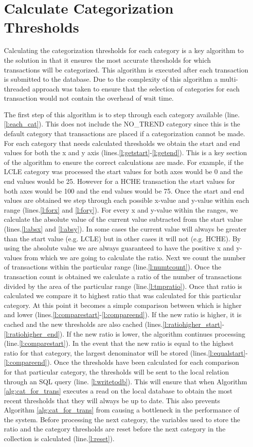 \section{Calculate Categorization Thresholds}
\label{pbs:calc_cat_thresholds}
Calculating the categorization thresholds for each category is a key algorithm to the solution in that it ensures the most accurate thresholds for which transactions will be categorized. This algorithm is executed after each transaction is submitted to the database. Due to the complexity of this algorithm a multi-threaded approach was taken to ensure that the selection of categories for each transaction would not contain the overhead of wait time.

The first step of this algorithm is to step through each category available (line.\ref{l:each_cat}). This does not include the NO\_TREND category since this is the default category that transactions are placed if a categorization cannot be made. For each category that needs calculated thresholds we obtain the start and end values for both the x and y axis (lines.\ref{l:getstart}-\ref{l:getend}). This is a key section of the algorithm to ensure the correct calculations are made. For example, if the LCLE category was processed the start values for both axes would be 0 and the end values would be 25. However for a HCHE transaction the start values for both axes would be 100 and the end values would be 75. Once the start and end values are obtained we step through each possible x-value and y-value within each range (lines.\ref{l:forx} and \ref{l:fory}). For every x and y-value within the ranges, we calculate the absolute value of the current value subtracted from the start value (lines.\ref{l:absx} and \ref{l:absy}). In some cases the current value will always be greater than the start value (e.g. LCLE) but in other cases it will not (e.g. HCHE). By using the absolute value we are always guaranteed to have the positive x and y-values from which we are going to calculate the ratio. Next we count the number of transactions within the particular range (line.\ref{l:numtcount}). Once the transaction count is obtained we calculate a ratio of the number of transactions divided by the area of the particular range (line.\ref{l:tmpratio}). Once that ratio is calculated we compare it to highest ratio that was calculated for this particular category. At this point it becomes a simple comparison between which is higher and lower (lines.\ref{l:comparestart}-\ref{l:compareend}). If the new ratio is higher, it is cached and the new thresholds are also cached (lines.\ref{l:ratiohigher_start}-\ref{l:ratiohigher_end}). If the new ratio is lower, the algorithm continues processing (line.\ref{l:comparestart}). In the event that the new ratio is equal to the highest ratio for that category, the largest denominator will be stored (lines.\ref{l:equalstart}-\ref{l:compareend}). Once the thresholds have been calculated for each comparison for that particular category, the thresholds will be sent to the local relation through an SQL query (line. \ref{l:writetodb}). This will ensure that when Algorithm \ref{alg:cat_for_trans} executes a read on the local database to obtain the most recent thresholds that they will always be up to date. This also prevents Algorithm \ref{alg:cat_for_trans} from causing a bottleneck in the performance of the system. Before processing the next category, the variables used to store the ratio and the category thresholds are reset before the next category in the collection is calculated (line.\ref{l:reset}).